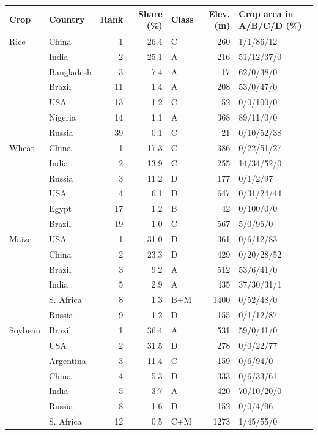 \begin{tabular}{llrrlrl}
\toprule
Crop & Country & Rank & Share (\%) & Class & Elev. (m) & Crop area in A/B/C/D (\%)\\
\midrule
Rice & China & 1 & 26.4 & C & 260 & 1/1/86/12 \\
 & India & 2 & 25.1 & A & 216 & 51/12/37/0 \\
 & Bangladesh & 3 & 7.4 & A & 17 & 62/0/38/0 \\
 & Brazil & 11 & 1.4 & A & 208 & 53/0/47/0 \\
 & USA & 13 & 1.2 & C & 52 & 0/0/100/0 \\
 & Nigeria & 14 & 1.1 & A & 368 & 89/11/0/0 \\
 & Russia & 39 & 0.1 & C & 21 & 0/10/52/38 \\
\midrule
Wheat & China & 1 & 17.3 & C & 386 & 0/22/51/27 \\
 & India & 2 & 13.9 & C & 255 & 14/34/52/0 \\
 & Russia & 3 & 11.2 & D & 177 & 0/1/2/97 \\
 & USA & 4 & 6.1 & D & 647 & 0/31/24/44 \\
 & Egypt & 17 & 1.2 & B & 42 & 0/100/0/0 \\
 & Brazil & 19 & 1.0 & C & 567 & 5/0/95/0 \\
\midrule
Maize & USA & 1 & 31.0 & D & 361 & 0/6/12/83 \\
 & China & 2 & 23.3 & D & 429 & 0/20/28/52 \\
 & Brazil & 3 & 9.2 & A & 512 & 53/6/41/0 \\
 & India & 5 & 2.9 & A & 435 & 37/30/31/1 \\
 & S. Africa & 8 & 1.3 & B+M & 1400 & 0/52/48/0 \\
 & Russia & 9 & 1.2 & D & 155 & 0/1/12/87 \\
\midrule
Soybean & Brazil & 1 & 36.4 & A & 531 & 59/0/41/0 \\
 & USA & 2 & 31.5 & D & 278 & 0/0/22/77 \\
 & Argentina & 3 & 11.4 & C & 159 & 0/6/94/0 \\
 & China & 4 & 5.3 & D & 333 & 0/6/33/61 \\
 & India & 5 & 3.7 & A & 420 & 70/10/20/0 \\
 & Russia & 8 & 1.6 & D & 152 & 0/0/4/96 \\
 & S. Africa & 12 & 0.5 & C+M & 1273 & 1/45/55/0 \\
\bottomrule
\end{tabular}
